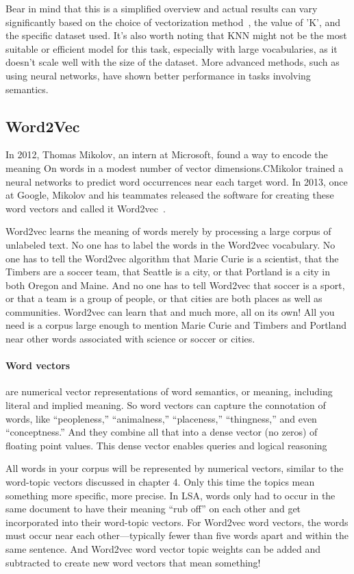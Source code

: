 \documentclass{article}
\begin{document}
Bear in mind that this is a simplified overview and actual results can vary significantly 
based on the choice of vectorization method~\cite{ZQXT20}, the value of 'K', and the specific 
dataset used.
It's also worth noting that KNN might not be the most suitable or efficient model for this 
task, especially with large vocabularies, as it doesn't scale well with the size of the 
dataset. More advanced methods, such as using neural networks, have shown better performance 
in tasks involving semantics.

\subsection{Word2Vec}
In 2012, Thomas Mikolov, an intern at Microsoft, found a way to encode the meaning On words 
in a modest number of vector dimensions.CMikolor trained a neural networks to predict word 
occurrences near each target word. In 2013, once at Google, Mikolov and his teammates 
released the software for creating these word vectors and called it Word2vec~\cite{MCCD13}.

Word2vec learns the meaning of words merely by processing a large corpus of unlabeled text. 
No one has to label the words in the Word2vec vocabulary. No one has to tell the Word2vec 
algorithm that Marie Curie is a scientist, that the Timbers are a soccer team, that Seattle 
is a city, or that Portland is a city in both Oregon and Maine. And no one has to tell 
Word2vec that soccer is a sport, or that a team is a group of people, or that cities are both 
places as well as communities. Word2vec can learn that and much more, all on its own! All you 
need is a corpus large enough to mention Marie Curie and Timbers and Portland near other 
words associated with science or soccer or cities.

\paragraph{Word vectors} are numerical vector representations of word semantics, or meaning, including literal and implied meaning. So word vectors can capture the connotation of words, like “peopleness,” “animalness,” “placeness,” “thingness,” and even “conceptness.” And they combine all that into a dense vector (no zeros) of floating point values. This dense vector enables queries and logical reasoning

All words in your corpus will be represented by numerical vectors, similar to the word-topic vectors discussed in chapter 4. Only this time the topics mean something more specific, more precise. In LSA, words only had to occur in the same document to have their meaning “rub off” on each other and get incorporated into their word-topic vectors. For Word2vec word vectors, the words must occur near each other—typically fewer than five words apart and within the same sentence. And Word2vec word vector topic weights can be added and subtracted to create new word vectors that mean something!
\end{document}
